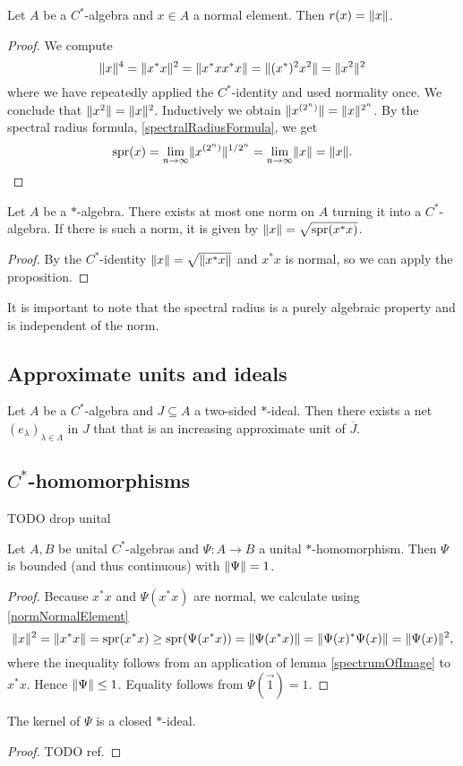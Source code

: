\begin{proposition} \label{normNormalElement}
Let $A$ be a $C^*$-algebra and $x\in A$ a normal element. Then $r(x) = \lVert x\rVert$.
\end{proposition}
\begin{proof}
We compute
\[ \lVert x\rVert^4 = \lVert x^*x\rVert^2 = \lVert x^*xx^*x\rVert = \lVert(x^*)^2x^2\rVert = \lVert x^2\rVert^2 \]
where we have repeatedly applied the $C^*$-identity and used normality once. We conclude that $\lVert x^2\rVert = \lVert x\rVert^2$. Inductively we obtain $\lVert x^{(2^n)}\rVert = \lVert x\rVert^{2^n}$. By the spectral radius formula, \ref{spectralRadiusFormula}, we get
\[ \operatorname{spr}(x) = \lim_{n\to\infty}\lVert x^{(2^n)}\rVert^{1/2^n} = \lim_{n\to\infty}\lVert x\rVert = \lVert x\rVert. \]
\end{proof}
\begin{corollary} \label{atMostOneNorm}
Let $A$ be a $*$-algebra. There exists at most one norm on $A$ turning it into a $C^*$-algebra. If there is such a norm, it is given by $\lVert x\rVert = \sqrt{\operatorname{spr}(x^*x)}$.
\end{corollary}
\begin{proof}
By the $C^*$-identity $\lVert x\rVert = \sqrt{\lVert x^*x\rVert}$ and $x^*x$ is normal, so we can apply the proposition.
\end{proof}
It is important to note that the spectral radius is a purely algebraic property and is independent of the norm.

\subsection{Approximate units and ideals}
\begin{proposition}
Let $A$ be a $C^*$-algebra and $J \subseteq A$ a two-sided $*$-ideal. Then there exists a net $(e_\lambda)_{\lambda\in\Lambda}$ in $J$ that that is an increasing approximate unit of $\overline{J}$.
\end{proposition}


\subsection{$C^*$-homomorphisms}
TODO drop unital
\begin{proposition}
Let $A,B$ be unital $C^*$-algebras and $\Psi: A\to B$ a unital $*$-homomorphism. Then $\Psi$ is bounded (and thus continuous) with $\lVert\Psi\rVert = 1$.
\end{proposition}
\begin{proof}
Because $x^*x$ and $\Psi(x^*x)$ are normal, we calculate using \ref{normNormalElement}
\[ \lVert x\rVert^2 = \lVert x^*x\rVert = \operatorname{spr}(x^*x) \geq \operatorname{spr}(\Psi(x^*x)) = \lVert\Psi(x^*x)\rVert = \lVert\Psi(x)^*\Psi(x)\rVert = \lVert\Psi(x)\rVert^2, \]
where the inequality follows from an application of lemma \ref{spectrumOfImage} to $x^*x$. Hence $\lVert\Psi\rVert\leq 1$. Equality follows from $\Psi(\vec{1}) = 1$.
\end{proof}
\begin{corollary}
The kernel of $\Psi$ is a closed $*$-ideal.
\end{corollary}
\begin{proof}
TODO ref.
\end{proof}

